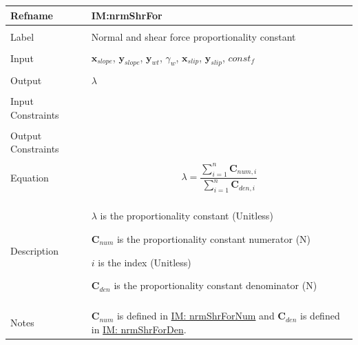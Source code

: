 \documentclass[12pt]{article}
\begin{document}
\vspace{\baselineskip}
\noindent
\begin{minipage}{\textwidth}
\begin{tabular}{>{\raggedright}p{}>{\raggedright\arraybackslash}p{}}
\toprule \textbf{Refname} & \textbf{IM:nrmShrFor}
\label{IM:nrmShrFor}
\\ \midrule \\
Label & Normal and shear force proportionality constant
        
\\ \midrule \\
Input & ${\mathbf{x}_{slope}}$, ${\mathbf{y}_{slope}}$, ${\mathbf{y}_{wt}}$, ${γ_{w}}$, ${\mathbf{x}_{slip}}$, ${\mathbf{y}_{slip}}$, $const_f$
        
\\ \midrule \\
Output & $λ$
         
\\ \midrule \\
Input Constraints & 
\\ \midrule \\
Output Constraints & 
\\ \midrule \\
Equation & \begin{displaymath}
           λ=\frac{\displaystyle\sum_{i=1}^{n}{{\mathbf{C}_{num,i}}}}{\displaystyle\sum_{i=1}^{n}{{\mathbf{C}_{den,i}}}}
           \end{displaymath}
\\ \midrule \\
Description & \begin{symbDescription}
              \item{$λ$ is the proportionality constant (Unitless)}
              \item{${\mathbf{C}_{num}}$ is the proportionality constant numerator (N)}
              \item{$i$ is the index (Unitless)}
              \item{${\mathbf{C}_{den}}$ is the proportionality constant denominator (N)}
              \end{symbDescription}
\\ \midrule \\
Notes & ${\mathbf{C}_{num}}$ is defined in \hyperref[IM:nrmShrForNum]{IM: nrmShrForNum} and ${\mathbf{C}_{den}}$ is defined in \hyperref[IM:nrmShrForDen]{IM: nrmShrForDen}.
        

\end{tabular}
\end{minipage}
\end{document}
